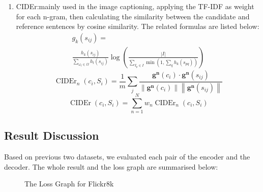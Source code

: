 \documentclass{article}
\begin{document}
\begin{enumerate}
\item CIDEr\cite{vedantam2015cider}:mainly used in the image captioning, applying the TF-IDF as weight for each n-gram, then calculating the similarity between the candidate and reference sentences by cosine similarity. The related formulas are listed below:
\begin{equation}
\begin{array}{l}
g_{k}\left(s_{i j}\right)= \\
\frac{h_{k}\left(s_{i j}\right)}{\sum_{\omega_{l} \in \Omega} h_{l}\left(s_{i j}\right)} \log \left(\frac{|I|}{\sum_{I_{p} \in I} \min \left(1, \sum_{q} h_{k}\left(s_{p q}\right)\right)}\right)
\end{array}
\end{equation}
\begin{equation}
\operatorname{CIDEr}_{n}\left(c_{i}, S_{i}\right)=\frac{1}{m} \sum_{j} \frac{\boldsymbol{g}^{\boldsymbol{n}}\left(c_{i}\right) \cdot \boldsymbol{g}^{\boldsymbol{n}}\left(s_{i j}\right)}{\left\|\boldsymbol{g}^{\boldsymbol{n}}\left(c_{i}\right)\right\|\left\|\boldsymbol{g}^{\boldsymbol{n}}\left(s_{i j}\right)\right\|} 
\end{equation}
\begin{equation}
\operatorname{CIDEr}\left(c_{i}, S_{i}\right)=\sum_{n=1}^{N} w_{n} \operatorname{CIDEr}_{n}\left(c_{i}, S_{i}\right)
\end{equation}

\end{enumerate}

\subsection{Result Discussion}

Based on previous two datasets, we evaluated each pair of the encoder and the decoder. The whole result and the loss graph are summarised below:

\begin{figure}[h]
\centering
{}
\caption{The Loss Graph for Flickr8k}
\label{fig3}
\end{figure}
\end{document}

